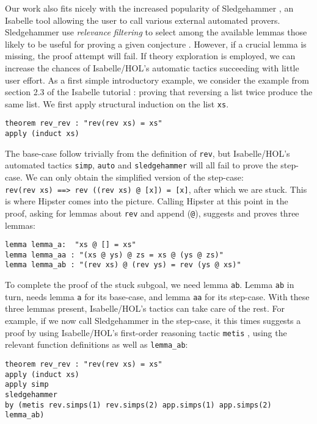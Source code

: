 Our work also fits nicely with the increased popularity of Sledgehammer \cite{sledgehammer}, an Isabelle tool allowing the user to call various external automated provers. Sledgehammer use \emph{relevance filtering} to select among the available lemmas those likely to be useful for proving a given conjecture \cite{mash}. However, if a crucial lemma is missing, the proof attempt will fail. If theory exploration is employed, we can increase the chances of Isabelle/HOL's automatic tactics succeeding with little user effort. As a first simple introductory example, we consider the example from section 2.3 of the Isabelle tutorial \cite{isabelle}: proving that reversing a list twice produce the same list. We first apply structural induction on the list \texttt{xs}.
\begin{verbatim}
theorem rev_rev : "rev(rev xs) = xs"
apply (induct xs)
\end{verbatim}
The base-case follow trivially from the definition of \texttt{rev}, but Isabelle/HOL's automated tactics \texttt{simp}, \texttt{auto} and \texttt{sledgehammer} will all fail to prove the step-case. We can only obtain the simplified version of the step-case: \\\texttt{rev(rev xs) ==> rev ((rev xs) @ [x]) = [x]}, after which we are stuck. This is where Hipster comes into the picture. Calling Hipster at this point in the proof, asking for lemmas about \texttt{rev} and append (\texttt{@}), suggests and proves three lemmas: 
\begin{verbatim}
lemma lemma_a:  "xs @ [] = xs"
lemma lemma_aa : "(xs @ ys) @ zs = xs @ (ys @ zs)"
lemma lemma_ab : "(rev xs) @ (rev ys) = rev (ys @ xs)"
\end{verbatim}
To complete the proof of the stuck subgoal, we need lemma \texttt{ab}. Lemma \texttt{ab} in turn, needs lemma \texttt{a} for its base-case, and lemma \texttt{aa} for its step-case. With these three lemmas present, Isabelle/HOL's tactics can take care of the rest. For example, if we now call Sledgehammer in the step-case, it this times suggests a proof by using Isabelle/HOL's first-order reasoning tactic \texttt{metis} \cite{metis}, using the relevant function definitions as well as \texttt{lemma\_ab}:
\begin{small}
\begin{verbatim}
theorem rev_rev : "rev(rev xs) = xs"
apply (induct xs)
apply simp
sledgehammer
by (metis rev.simps(1) rev.simps(2) app.simps(1) app.simps(2) lemma_ab)
\end{verbatim}
\end{small}
 
